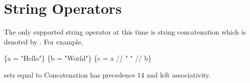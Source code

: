 \section{String Operators}

The only supported string operator at this time is string concatenation which is
denoted by \cmd{//}. For example,
\begin{apinp}
\{a = "Hello"\} \{b = "World"\}
\{c = a // " " //  b\}
\end{apinp}
sets  equal to   Concatenation
has precedence 14 and left associativity.
